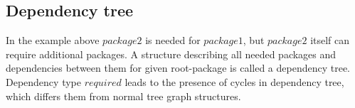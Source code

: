 \subsection*{Dependency tree}
In the example above $package2$ is needed for $package1$, but $package2$ itself can require additional packages.
A structure describing all needed packages and dependencies between them for given root-package is called a dependency tree. 
Dependency type $required$ leads to the presence of cycles in dependency tree, which differs them from normal tree graph structures.


